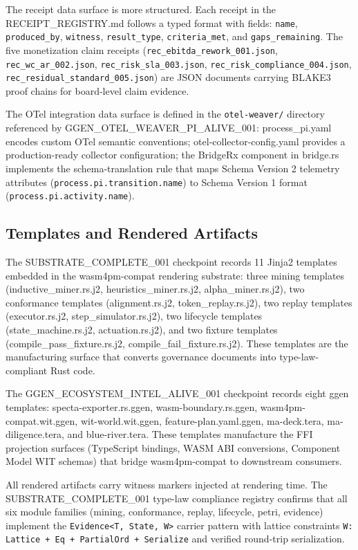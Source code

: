 The receipt data surface is more structured. Each receipt in the RECEIPT\_REGISTRY.md follows a
typed format with fields: \texttt{name}, \texttt{produced\_by}, \texttt{witness}, \texttt{result\_type},
\texttt{criteria\_met}, and \texttt{gaps\_remaining}. The five monetization claim receipts
(\texttt{rec\_ebitda\_rework\_001.json}, \texttt{rec\_wc\_ar\_002.json}, \texttt{rec\_risk\_sla\_003.json},
\texttt{rec\_risk\_compliance\_004.json}, \texttt{rec\_residual\_standard\_005.json}) are JSON documents
carrying BLAKE3 proof chains for board-level claim evidence.

The OTel integration data surface is defined in the \texttt{otel-weaver/} directory referenced by
GGEN\_OTEL\_WEAVER\_PI\_ALIVE\_001: process\_pi.yaml encodes custom OTel semantic conventions;
otel-collector-config.yaml provides a production-ready collector configuration; the BridgeRx
component in bridge.rs implements the schema-translation rule that maps Schema Version 2 telemetry
attributes (\texttt{process.pi.transition.name}) to Schema Version 1 format
(\texttt{process.pi.activity.name}).

\subsection{Templates and Rendered Artifacts}
\label{sec:checkpoints-implementation-templates}

The SUBSTRATE\_COMPLETE\_001 checkpoint records 11 Jinja2 templates embedded in the wasm4pm-compat
rendering substrate: three mining templates (inductive\_miner.rs.j2, heuristics\_miner.rs.j2,
alpha\_miner.rs.j2), two conformance templates (alignment.rs.j2, token\_replay.rs.j2), two replay
templates (executor.rs.j2, step\_simulator.rs.j2), two lifecycle templates (state\_machine.rs.j2,
actuation.rs.j2), and two fixture templates (compile\_pass\_fixture.rs.j2,
compile\_fail\_fixture.rs.j2). These templates are the manufacturing surface that converts governance
documents into type-law-compliant Rust code.

The GGEN\_ECOSYSTEM\_INTEL\_ALIVE\_001 checkpoint records eight ggen templates: specta-exporter.rs.ggen,
wasm-boundary.rs.ggen, wasm4pm-compat.wit.ggen, wit-world.wit.ggen, feature-plan.yaml.ggen,
ma-deck.tera, ma-diligence.tera, and blue-river.tera. These templates manufacture the FFI projection
surfaces (TypeScript bindings, WASM ABI conversions, Component Model WIT schemas) that bridge
wasm4pm-compat to downstream consumers.

All rendered artifacts carry witness markers injected at rendering time. The SUBSTRATE\_COMPLETE\_001
type-law compliance registry confirms that all six module families (mining, conformance, replay,
lifecycle, petri, evidence) implement the \texttt{Evidence<T, State, W>} carrier pattern with lattice
constraints \texttt{W: Lattice + Eq + PartialOrd + Serialize} and verified round-trip serialization.
